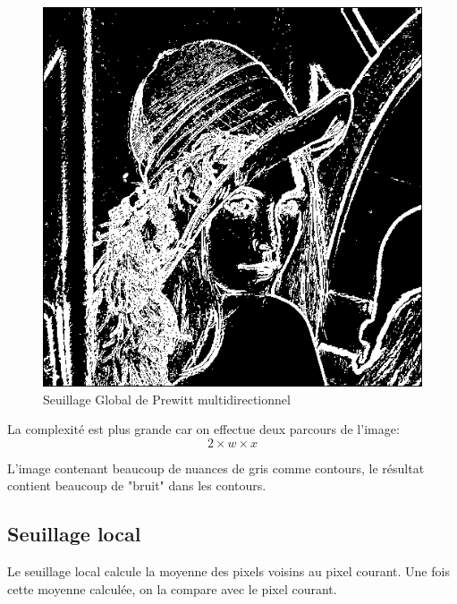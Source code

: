 \documentclass[11pt]{article}
\begin{document}
	\begin{figure}[H]
		\centering
		\includegraphics[scale=0.25]{Image/seuilGlobal.png}
		\caption{Seuillage Global de Prewitt multidirectionnel}
		\label{fig:seuilGlobal}
	\end{figure} 

	La complexité est plus grande car on effectue deux parcours de l’image: \[2 \times w \times x\]

	L’image contenant beaucoup de nuances de gris comme contours, le résultat contient beaucoup de "bruit" dans les contours.

	\subsection{Seuillage local}

	Le seuillage local calcule la moyenne des pixels voisins au pixel courant. 
	Une fois cette moyenne calculée, on la compare avec le pixel courant.
\end{document}
